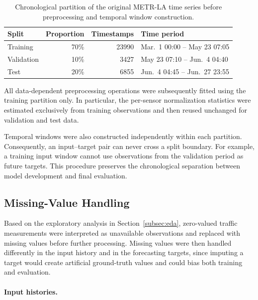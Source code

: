 \begin{table}[t]
    \centering
    \caption{Chronological partition of the original METR-LA time series
    before preprocessing and temporal window construction.}
    \label{tab:chronological_split}
    \begin{tabular}{lrrl}
        \toprule
        Split & Proportion & Timestamps & Time period \\
        \midrule
        Training   & 70\% & 23990 &
        Mar.\ 1 00:00 -- May 23 07:05 \\
        Validation & 10\% & 3427 &
        May 23 07:10 -- Jun.\ 4 04:40 \\
        Test       & 20\% & 6855 &
        Jun.\ 4 04:45 -- Jun.\ 27 23:55 \\
        \bottomrule
    \end{tabular}
\end{table}

All data-dependent preprocessing operations were subsequently fitted using
the training partition only. In particular, the per-sensor normalization
statistics were estimated exclusively from training observations and then
reused unchanged for validation and test data.

Temporal windows were also constructed independently within each partition.
Consequently, an input--target pair can never cross a split boundary. For
example, a training input window cannot use observations from the validation
period as future targets. This procedure preserves the chronological
separation between model development and final evaluation.



\subsection{Missing-Value Handling}
\label{subsec:missing}

Based on the exploratory analysis in
Section~\ref{subsec:eda}, zero-valued traffic measurements were interpreted
as unavailable observations and replaced with missing values before further
processing. Missing values were then handled differently in the input
history and in the forecasting targets, since imputing a target would create
artificial ground-truth values and could bias both training and evaluation.

\paragraph{Input histories.}

